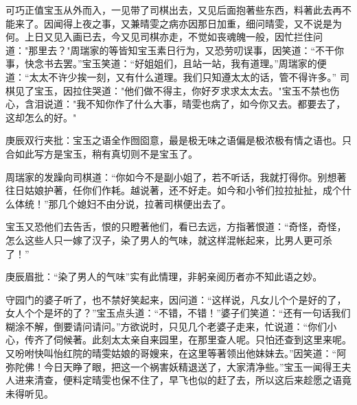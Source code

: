 \begin{parag}
    可巧正值宝玉从外而入，一见带了司棋出去，又见后面抱著些东西，料著此去再不能来了。因闻得上夜之事，又兼晴雯之病亦因那日加重，细问晴雯，又不说是为何。上日又见入画已去，今又见司棋亦走，不觉如丧魂魄一般，因忙拦住问道："那里去？"周瑞家的等皆知宝玉素日行为，又恐劳叨误事，因笑道：“不干你事，快念书去罢。”宝玉笑道：“好姐姐们，且站一站，我有道理。”周瑞家的便道：“太太不许少挨一刻，又有什么道理。我们只知遵太太的话，管不得许多。” 司棋见了宝玉，因拉住哭道："他们做不得主，你好歹求求太太去。"宝玉不禁也伤心，含泪说道："我不知你作了什么大事，晴雯也病了，如今你又去。都要去了，这却怎么的好。"\begin{note}庚辰双行夹批：宝玉之语全作囫囵意，最是极无味之语偏是极浓极有情之语也。只合如此写方是宝玉，稍有真切则不是宝玉了。\end{note}周瑞家的发躁向司棋道：“你如今不是副小姐了，若不听话，我就打得你。别想著往日姑娘护著，任你们作耗。越说著，还不好走。如今和小爷们拉拉扯扯，成个什么体统！”那几个媳妇不由分说，拉著司棋便出去了。
\end{parag}


\begin{parag}
    宝玉又恐他们去告舌，恨的只瞪著他们，看已去远，方指著恨道：“奇怪，奇怪，怎么这些人只一嫁了汉子，染了男人的气味，就这样混帐起来，比男人更可杀了！”\begin{note}庚辰眉批：“染了男人的气味”实有此情理，非躬亲阅历者亦不知此语之妙。\end{note}守园门的婆子听了，也不禁好笑起来，因问道：“这样说，凡女儿个个是好的了，女人个个是坏的了？”宝玉点头道：“不错，不错！”婆子们笑道：“还有一句话我们糊涂不解，倒要请问请问。”方欲说时，只见几个老婆子走来，忙说道：“你们小心，传齐了伺候著。此刻太太亲自来园里，在那里查人呢。只怕还查到这里来呢。又吩咐快叫怡红院的晴雯姑娘的哥嫂来，在这里等著领出他妹妹去。”因笑道：“阿弥陀佛！今日天睁了眼，把这一个祸害妖精退送了，大家清净些。”宝玉一闻得王夫人进来清查，便料定晴雯也保不住了，早飞也似的赶了去，所以这后来趁愿之语竟未得听见。
\end{parag}



